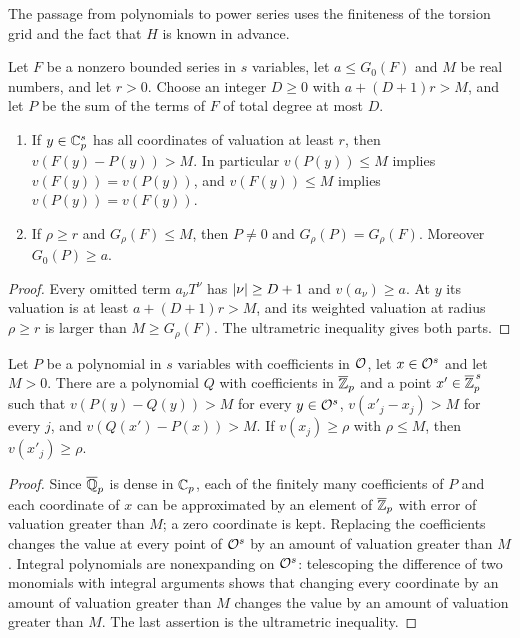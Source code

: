 The passage from polynomials to power series uses the finiteness of the torsion grid and
the fact that $H$ is known in advance.

\begin{lemma}[Truncation]\label{tors:lem:truncation}
Let $F$ be a nonzero bounded series in $s$ variables, let $a\le G_0(F)$ and $M$ be real
numbers, and let $r>0$. Choose an integer $D\ge0$ with $a+(D+1)r>M$, and let $P$ be the
sum of the terms of $F$ of total degree at most $D$.
\begin{enumerate}[label=\textup{(\alph*)}]
\item If $y\in\mathbb{C}_p^s$ has all coordinates of valuation at least $r$, then
  $v(F(y)-P(y))>M$. In particular $v(P(y))\le M$ implies $v(F(y))=v(P(y))$, and
  $v(F(y))\le M$ implies $v(P(y))=v(F(y))$.
\item If $\rho\ge r$ and $G_\rho(F)\le M$, then $P\ne0$ and $G_\rho(P)=G_\rho(F)$.
  Moreover $G_0(P)\ge a$.
\end{enumerate}
\end{lemma}

\begin{proof}
Every omitted term $a_\nu T^\nu$ has $\lvert\nu\rvert\ge D+1$ and $v(a_\nu)\ge a$. At $y$ its
valuation is at least $a+(D+1)r>M$, and its weighted valuation at radius $\rho\ge r$ is
larger than $M\ge G_\rho(F)$. The ultrametric inequality gives both parts.
\end{proof}

\begin{lemma}\label{tors:lem:approx}
Let $P$ be a polynomial in $s$ variables with coefficients in $\mathcal{O}$, let $x\in\mathcal{O}^s$ and
let $M>0$. There are a polynomial $Q$ with coefficients in $\overline{\mathbb{Z}}_p$ and a point
$x'\in\overline{\mathbb{Z}}_p^{\,s}$ such that $v(P(y)-Q(y))>M$ for every $y\in\mathcal{O}^s$,
$v(x'_j-x_j)>M$ for every $j$, and $v(Q(x')-P(x))>M$. If $v(x_j)\ge\rho$ with
$\rho\le M$, then $v(x'_j)\ge\rho$.
\end{lemma}

\begin{proof}
Since $\overline{\mathbb{Q}}_p$ is dense in $\mathbb{C}_p$, each of the finitely many coefficients of $P$ and
each coordinate of $x$ can be approximated by an element of $\overline{\mathbb{Z}}_p$ with error of
valuation greater than $M$; a zero coordinate is kept. Replacing the coefficients changes
the value at every point of $\mathcal{O}^s$ by an amount of valuation greater than $M$. Integral
polynomials are nonexpanding on $\mathcal{O}^s$: telescoping the difference of two monomials with
integral arguments shows that changing every coordinate by an amount of valuation greater
than $M$ changes the value by an amount of valuation greater than $M$. The last assertion
is the ultrametric inequality.
\end{proof}

